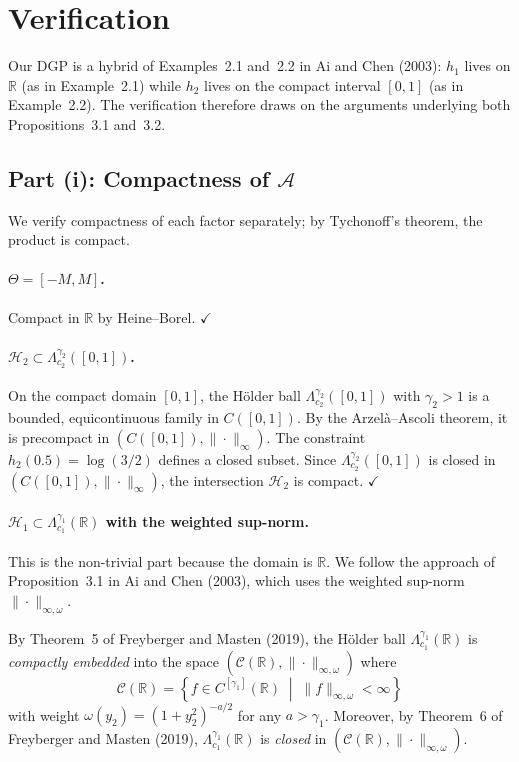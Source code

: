 \documentclass[12pt]{article}
\begin{document}
\section{Verification}

Our DGP is a hybrid of Examples~2.1 and~2.2 in Ai and Chen (2003): $h_1$ lives on $\mathbb{R}$ (as in Example~2.1) while $h_2$ lives on the compact interval $[0,1]$ (as in Example~2.2). The verification therefore draws on the arguments underlying both Propositions~3.1 and~3.2.

\subsection{Part (i): Compactness of $\mathcal{A}$}

We verify compactness of each factor separately; by Tychonoff's theorem, the product is compact.

\paragraph{$\Theta = [-M, M]$.} Compact in $\mathbb{R}$ by Heine--Borel. \hfill $\checkmark$

\paragraph{$\mathcal{H}_2 \subset \Lambda_{c_2}^{\gamma_2}([0,1])$.} On the compact domain $[0,1]$, the H\"{o}lder ball $\Lambda_{c_2}^{\gamma_2}([0,1])$ with $\gamma_2 > 1$ is a bounded, equicontinuous family in $C([0,1])$. By the Arzel\`{a}--Ascoli theorem, it is precompact in $(C([0,1]), \|\cdot\|_\infty)$. The constraint $h_2(0.5) = \log(3/2)$ defines a closed subset. Since $\Lambda_{c_2}^{\gamma_2}([0,1])$ is closed in $(C([0,1]), \|\cdot\|_\infty)$, the intersection $\mathcal{H}_2$ is compact. \hfill $\checkmark$

\paragraph{$\mathcal{H}_1 \subset \Lambda_{c_1}^{\gamma_1}(\mathbb{R})$ with the weighted sup-norm.}
This is the non-trivial part because the domain is $\mathbb{R}$. We follow the approach of Proposition~3.1 in Ai and Chen (2003), which uses the weighted sup-norm $\|\cdot\|_{\infty, \omega}$.

By Theorem~5 of Freyberger and Masten (2019), the H\"{o}lder ball $\Lambda_{c_1}^{\gamma_1}(\mathbb{R})$ is \emph{compactly embedded} into the space $(\mathscr{C}(\mathbb{R}), \|\cdot\|_{\infty, \omega})$ where
\[
\mathscr{C}(\mathbb{R}) = \left\{ f \in C^{[\gamma_1]}(\mathbb{R}) \;\middle|\; \|f\|_{\infty, \omega} < \infty \right\}
\]
with weight $\omega(y_2) = (1+y_2^2)^{-a/2}$ for any $a > \gamma_1$. Moreover, by Theorem~6 of Freyberger and Masten (2019), $\Lambda_{c_1}^{\gamma_1}(\mathbb{R})$ is \emph{closed} in $(\mathscr{C}(\mathbb{R}), \|\cdot\|_{\infty,\omega})$.
\end{document}
